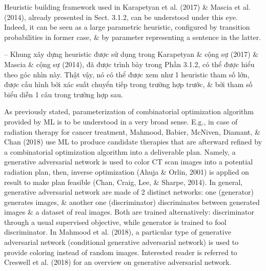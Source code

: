 \documentclass{article}
\begin{document}
\begin{itemize}
\begin{itemize}
\begin{itemize}
            Heuristic building framework used in Karapetyan et al. (2017) \& Mascia et al. (2014), already presented in Sect. 3.1.2, can be understood under this eye. Indeed, it can be seen as a large parametric heuristic, configured by transition probabilities in former case, \& by parameter representing a sentence in the latter.

            -- Khung xây dựng heuristic được sử dụng trong Karapetyan \& cộng sự (2017) \& Mascia \& cộng sự (2014), đã được trình bày trong Phần 3.1.2, có thể được hiểu theo góc nhìn này. Thật vậy, nó có thể được xem như 1 heuristic tham số lớn, được cấu hình bởi xác suất chuyển tiếp trong trường hợp trước, \& bởi tham số biểu diễn 1 câu trong trường hợp sau.

            As previously stated, parameterization of combinatorial optimization algorithm provided by ML is to be understood in a very broad sense. E.g., in case of radiation therapy for cancer treatment, Mahmood, Babier, McNiven, Diamant, \& Chan (2018) use ML to produce candidate therapies that are afterward refined by a combinatorial optimization algorithm into a deliverable plan. Namely, a generative adversarial network is used to color CT scan images into a potential radiation plan, then, inverse optimization (Ahuja \& Orlin, 2001) is applied on result to make plan feasible (Chan, Craig, Lee, \& Sharpe, 2014). In general, generative adversarial network are made of 2 distinct networks: one (generator) generates images, \& another one (discriminator) discriminates between generated images \& a dataset of real images. Both are trained alternatively: discriminator through a usual supervised objective, while generator is trained to fool discriminator. In Mahmood et al. (2018), a particular type of generative adversarial network (conditional generative adversarial network) is used to provide coloring instead of random images. Interested reader is referred to Creswell et al. (2018) for an overview on generative adversarial network.


\end{itemize}
\end{itemize}
\end{itemize}
\end{document}

